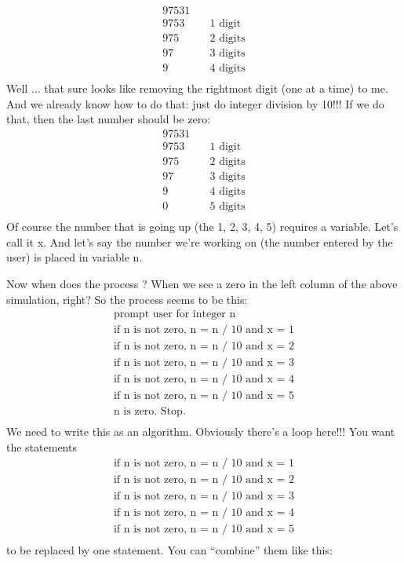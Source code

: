 \begin{align*}
97531\\
9753 &\quad\text{1 digit}\\
975 &\quad\text{2 digits}\\
97 &\quad\text{3 digits}\\
9 &\quad\text{4 digits}\\
\end{align*}
Well ... that sure looks like removing the rightmost digit (one at a
time) to me. And we already know how to do that: just do integer
division by 10!!! If we do that, then the last number should be zero:\\
\begin{align*}
97531\\
9753 &\quad\text{1 digit}\\
975 &\quad\text{2 digits}\\
97 &\quad\text{3 digits}\\
9 &\quad\text{4 digits}\\
0 &\quad\text{5 digits}\\
\end{align*}
Of course the number that is going up (the 1, 2, 3, 4, 5) requires a
variable. Let's call it x. And let's say
the number we're working on (the number entered by the
user) is placed in variable n.

Now when does the process ? When we see a zero in the left
column of the above simulation, right? So the process seems to be this:
\begin{align*}
\text{prompt user for integer n}\\
\text{if n is not zero, n = n / 10 and x = 1}\\
\text{if n is not zero, n = n / 10 and x = 2}\\
\text{if n is not zero, n = n / 10 and x = 3}\\
\text{if n is not zero, n = n / 10 and x = 4}\\
\text{if n is not zero, n = n / 10 and x = 5}\\
\text{n is zero. Stop.}\\
\end{align*}
We need to write this as an algorithm. Obviously there's
a loop here!!! You want the statements
\begin{align*}
\text{if n is not zero, n = n / 10 and x = 1}\\
\text{if n is not zero, n = n / 10 and x = 2}\\
\text{if n is not zero, n = n / 10 and x = 3}\\
\text{if n is not zero, n = n / 10 and x = 4}\\
\text{if n is not zero, n = n / 10 and x = 5}\\
\end{align*}
to be replaced by one statement. You can ``combine'' them like this:

